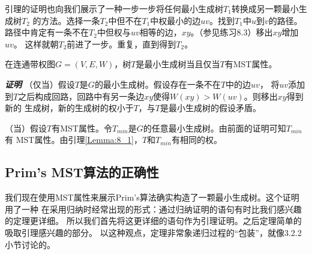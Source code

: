 引理的证明也向我们展示了一种一步一步将任何最小生成树$T_1$转换成另一颗最小生成树$T_2$
的方法。选择一条$T_2$中但不在$T_1$中权最小的边$uv$。找到$T_1$中$u$到$v$的路径。
路径中肯定有一条不在$T_2$中但权与$uv$相等的边，$xy$。（参见练习8.3）移出$xy$增加$uv$。
这样就朝$T_2$前进了一步。重复，直到得到$T_2$。

\begin{theorem}
在连通带权图$G=(V, E, W)$，树$T$是最小生成树当且仅当$T$有MST属性。

{\textbf{\emph{证明}}} （仅当）假设$T$是$G$的最小生成树。假设存在一条不在$T$中的边$uv$，
将$uv$添加到$T$之后构成回路，回路中有另一条边$xy$使得$W(xy)>W(uv)$。则移出$xy$得到新的
生成树，新的生成树的权小于$T$，与$T$是最小生成树的假设矛盾。

（当）假设$T$有MST属性。令$T_{min}$是$G$的任意最小生成树。由前面的证明可知$T_{min}$有
MST属性。由引理\ref{Lemma:8_1}，$T$和$T_{min}$有相同的权。

\end{theorem}

\subsection{Prim's MST算法的正确性}
我们现在使用MST属性来展示Prim's算法确实构造了一颗最小生成树。这个证明用了一种
在采用归纳时经常出现的形式：通过归纳证明的语句有时比我们感兴趣的定理更详细。
所以我们首先将这更详细的语句作为引理证明。之后定理简单的吸取引理感兴趣的部分。
以这种观点，定理非常象递归过程的“包装”，就像3.2.2小节讨论的。

